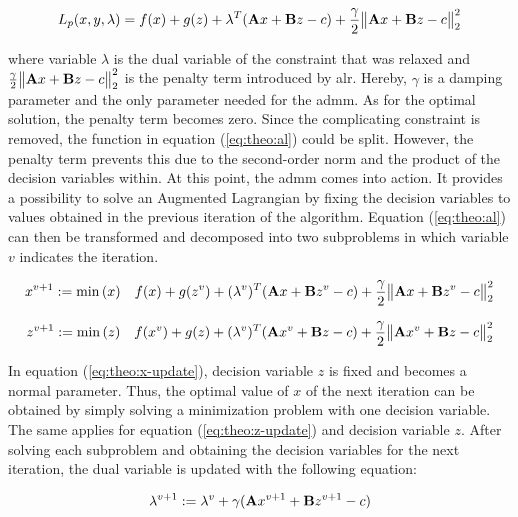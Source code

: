 \begin{equation}
	L_p(x,y, \lambda) = f(x) + g(z) + \lambda^T(\vb{A}x + \vb{B}z - c) + \frac{\gamma}{2}\big\| \vb{A}x + \vb{B}z - c \big\|^2_2 \label{eq:theo:al}
\end{equation}

where variable $\lambda$ is the dual variable of the constraint that was relaxed and $\frac{\gamma}{2}\big\| \vb{A}x + \vb{B}z - c \big\|^2_2$ is the penalty term introduced by \gls{alr}. Hereby, $\gamma$ is a damping parameter and the only parameter needed for the \gls{admm}. As for the optimal solution, the penalty term becomes zero. Since the complicating constraint is removed, the function in equation (\ref{eq:theo:al}) could be split. However, the penalty term prevents this due to the second-order norm and the product of the decision variables within. At this point, the \gls{admm} comes into action. It provides a possibility to solve an Augmented Lagrangian by fixing the decision variables to values obtained in the previous iteration of the algorithm. Equation (\ref{eq:theo:al}) can then be transformed and decomposed into two subproblems in which variable $v$ indicates the iteration.

\begin{equation}
	x^{v+1} := \min{(x)} \quad f(x) + g(z^{v}) + (\lambda^v)^T(\vb{A}x + \vb{B}z^v - c) + \frac{\gamma}{2}\big\| \vb{A}x + \vb{B}z^v - c \big\|^2_2 \label{eq:theo:x-update}
\end{equation}

\begin{equation}
	z^{v+1} := \min{(z)} \quad f(x^v) + g(z) + (\lambda^v)^T(\vb{A}x^v + \vb{B}z - c) + \frac{\gamma}{2}\big\| \vb{A}x^v + \vb{B}z - c \big\|^2_2 \label{eq:theo:z-update}
\end{equation}

In equation (\ref{eq:theo:x-update}), decision variable $z$ is fixed and becomes a normal parameter. Thus, the optimal value of $x$ of the next iteration can be obtained by simply solving a minimization problem with one decision variable. The same applies for equation (\ref{eq:theo:z-update}) and decision variable $z$. After solving each subproblem and obtaining the decision variables for the next iteration, the dual variable is updated with the following equation: 

\begin{equation}
	\lambda^{v+1} :=  \lambda^{v} + \gamma(\vb{A}x^{v+1} + \vb{B}z^{v+1} - c)
\end{equation}

